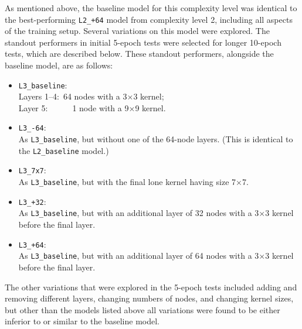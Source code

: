 As mentioned above, the baseline model for this complexity level was identical to the best-performing \texttt{L2\_+64} model from complexity level 2, including all aspects of the training setup. Several variations on this model were explored. The standout performers in initial 5-epoch tests were selected for longer 10-epoch tests, which are described below. These standout performers, alongside the baseline model, are as follows:
\begin{itemize}
\item \texttt{L3\_baseline}: \\
\hspace*{1em}Layers 1--4:~64 nodes with a 3$\times$3 kernel; \\
\hspace*{1em}Layer 5:~~~~~~1 node with a 9$\times$9 kernel.
\item \texttt{L3\_-64}: \\
\hspace*{1em}As \texttt{L3\_baseline}, but without one of the 64-node layers. (This is identical to the \texttt{L2\_baseline} model.)
\item \texttt{L3\_7x7}: \\
\hspace*{1em}As \texttt{L3\_baseline}, but with the final lone kernel having size 7$\times$7.
\item \texttt{L3\_+32}: \\
\hspace*{1em}As \texttt{L3\_baseline}, but with an additional layer of 32 nodes with a 3$\times$3 kernel before the final layer.
\item \texttt{L3\_+64}: \\
\hspace*{1em}As \texttt{L3\_baseline}, but with an additional layer of 64 nodes with a 3$\times$3 kernel before the final layer.
\end{itemize}
The other variations that were explored in the 5-epoch tests included adding and removing different layers, changing numbers of nodes, and changing kernel sizes, but other than the models listed above all variations were found to be either inferior to or similar to the baseline model.

